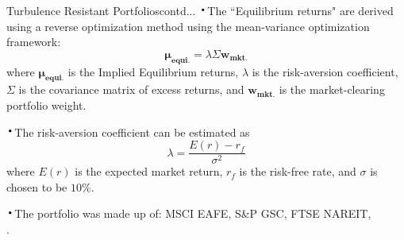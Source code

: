 \documentclass{beamer}
\newcommand*{\LargerCdot}{\raisebox{-0.25ex}{\scalebox{2.3}{$\cdot$}}}
\begin{document}
\begin{frame}{Turbulence Resistant Portfolios}{contd...}
	$\LargerCdot$The ``Equilibrium returns" are derived using a reverse optimization method using the mean-variance optimization framework:
\vspace*{-0.1in}
$$
		\mathbf{\mu_{equi.}} = \lambda \Sigma \mathbf{w_{mkt.}}
$$ where $\mathbf{\mu_{equi.}}$ is the Implied Equilibrium returns,\newline
\hspace*{0.35 in}$\lambda$ is the risk-aversion coefficient,\newline
\hspace*{0.35 in}$\Sigma$ is the covariance matrix of excess returns, and\newline
\hspace*{0.35 in}$\mathbf{w_{mkt.}}$ is the market-clearing portfolio weight.\newline

$\LargerCdot$The risk-aversion coefficient  can be estimated as
$$
	\lambda = \frac{E(r) - r_f}{\sigma^2}
$$
where $E(r)$ is the expected market return, $r_f$ is the risk-free rate, and $\sigma$ is chosen to be $10\%$.  

$\LargerCdot$The portfolio was made up of: MSCI EAFE, S\&P GSC, FTSE NAREIT, {\color{blue}{Barclays US Treasury Long, S\&P 500}} {\color{black}{and}} \\ {\color{blue}{Barclays US Agg}}.

\end{frame}
\end{document}
